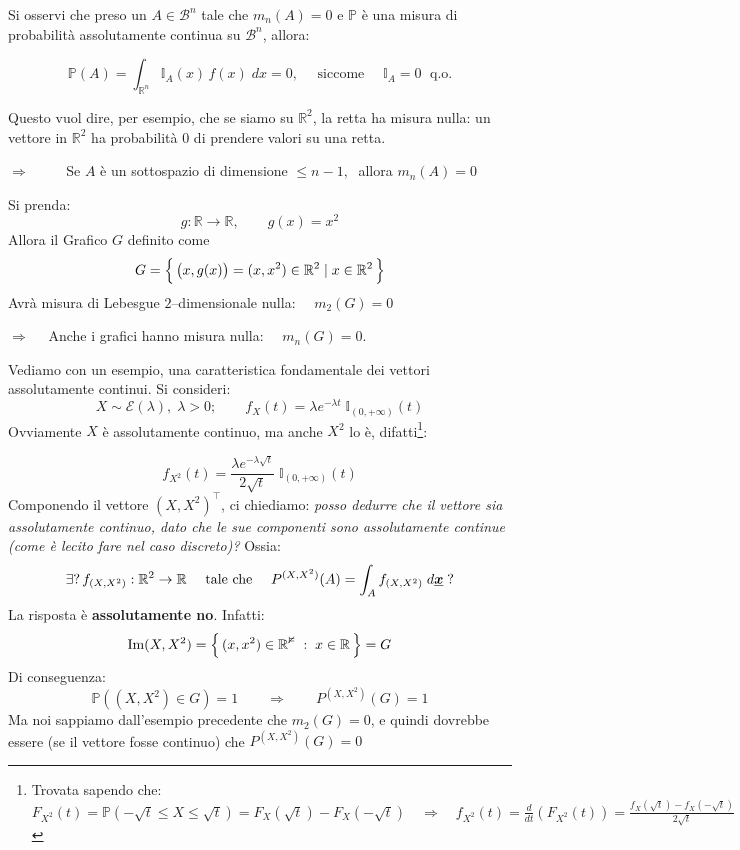 Si osservi che preso un $A\in \mathcal{B}^n$ tale che $m_n(A)=0$ e $\mathbb{P}$ è una misura di probabilità assolutamente continua su $\mathcal{B}^n$, allora:

\[\mathbb{P}(A) = \int_{\mathbb{R}^n} \mathbb{I}_A(x)\,f(x)\;dx = 0, \quad \text{ siccome }\quad \mathbb{I}_A=0 \;\text{ q.o.}\]

\noindent Questo vuol dire, per esempio, che se siamo su $\mathbb{R}^2$, la retta ha misura nulla: un vettore in $\mathbb{R}^2$ ha probabilità $0$ di prendere valori su una retta.

\(\Rightarrow\qquad\;\) Se $A$ è un sottospazio di dimensione $\leq n-1, \;$ allora $m_n(A) = 0$

\begin{esempio}
    Si prenda:
    \[
        g:\mathbb{R}\to\mathbb{R}, \qquad g(x) = x^2
    \]
    Allora il Grafico $G$ definito come
    \[G=\Bigl\{\,\bigl(x, g(x)\bigr)=(x, x^2)\in\mathbb{R}^2\mid x\in\mathbb{R}^2\,\Bigr\}\]
    Avrà misura di Lebesgue $2$--dimensionale nulla: $\quad m_2(G)=0$
\end{esempio}
\(\Rightarrow\quad\) Anche i grafici hanno misura nulla: $\quad m_n(G) = 0$.
\begin{esempio}[\faWarning]
    Vediamo con un esempio, una caratteristica fondamentale dei vettori assolutamente continui. Si consideri:
    \[X\sim \mathcal{E}(\lambda), \;\lambda >0;\qquad f_X(t) = \lambda e^{-\lambda t}\;\mathbb{I}_{(0, +\infty)}(t)\]
    Ovviamente $X$ è assolutamente continuo, ma anche $X^2$ lo è, difatti\footnote{Trovata sapendo che: $F_{X^2}(t) = \mathbb{P}(-\sqrt{t}\leq X\leq \sqrt{t}) = F_X(\sqrt{t})-F_X(-\sqrt{t})\quad \Rightarrow\quad f_{X^2}(t) = \frac{d}{dt}\left(F_{X^2}(t)\right) = \frac{f_X(\sqrt{t})-f_X(-\sqrt{t})}{2\sqrt{t}}$}:
    
    \[f_{X^2}(t) = \frac{\lambda e^{-\lambda \sqrt{t}}}{2\sqrt{t}}\;\mathbb{I}_{(0, +\infty)}(t)\]
    Componendo il vettore $(X, X^2)^\top$, ci chiediamo: \textit{posso dedurre che il vettore sia assolutamente continuo, dato che le sue componenti sono assolutamente continue (come è lecito fare nel caso discreto)?} Ossia:
    \[\exists?\,f_{(X, X^2)}:\mathbb{R}^2\to\mathbb{R}\quad \text{ tale che }\quad  P^{(X, X^2)}(A) = \int_Af_{(X, X^2)}\;d\underline{{\boldsymbol{x}}}\;?\]
    La risposta è \textbf{assolutamente no}. Infatti:
    \[\text{Im}(X, X^2) = \Bigl\{\,(x, x^2)\in\mathbb{R^2}\;:\;x\in\mathbb{R}\,\Bigr\} = G\]
    Di conseguenza:
    \[\mathbb{P}((X, X^2)\in G) = 1\qquad \Rightarrow\qquad P^{(X, X^2)}(G) = 1\]
    Ma noi sappiamo dall'esempio precedente che $m_2(G) = 0$, e quindi dovrebbe essere (se il vettore fosse continuo) che $P^{(X, X^2)}(G) = 0$
\end{esempio}

